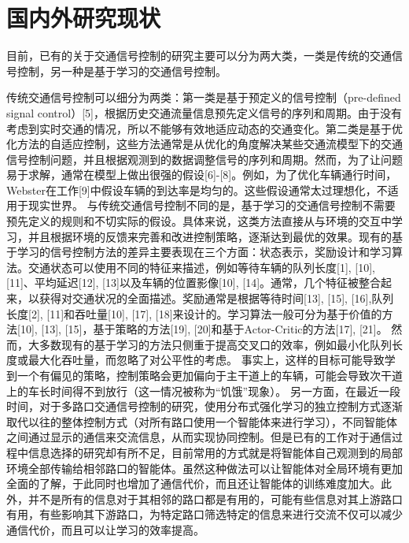 \section{国内外研究现状}
目前，已有的关于交通信号控制的研究主要可以分为两大类，一类是传统的交通信号控制，另一种是基于学习的交通信号控制。

传统交通信号控制可以细分为两类：第一类是基于预定义的信号控制（pre-defined signal control）[5]，根据历史交通流量信息预先定义信号的序列和周期。由于没有考虑到实时交通的情况，所以不能够有效地适应动态的交通变化。第二类是基于优化方法的自适应控制，这些方法通常是从优化的角度解决某些交通流模型下的交通信号控制问题，并且根据观测到的数据调整信号的序列和周期。然而，为了让问题易于求解，通常在模型上做出很强的假设[6]-[8]。例如，为了优化车辆通行时间，Webster在工作[9]中假设车辆的到达率是均匀的。这些假设通常太过理想化，不适用于现实世界。
与传统交通信号控制不同的是，基于学习的交通信号控制不需要预先定义的规则和不切实际的假设。具体来说，这类方法直接从与环境的交互中学习，并且根据环境的反馈来完善和改进控制策略，逐渐达到最优的效果。现有的基于学习的信号控制方法的差异主要表现在三个方面：状态表示，奖励设计和学习算法。交通状态可以使用不同的特征来描述，例如等待车辆的队列长度[1], [10], [11]、平均延迟[12], [13]以及车辆的位置影像[10], [14]。通常，几个特征被整合起来，以获得对交通状况的全面描述。奖励通常是根据等待时间[13], [15], [16],队列长度[2], [11]和吞吐量[10], [17], [18]来设计的。学习算法一般可分为基于价值的方法[10], [13], [15]，基于策略的方法[19], [20]和基于Actor-Critic的方法[17], [21]。
然而，大多数现有的基于学习的方法只侧重于提高交叉口的效率，例如最小化队列长度或最大化吞吐量，而忽略了对公平性的考虑。 事实上，这样的目标可能导致学到一个有偏见的策略，控制策略会更加偏向于主干道上的车辆，可能会导致次干道上的车长时间得不到放行（这一情况被称为“饥饿”现象）。 另一方面，在最近一段时间，对于多路口交通信号控制的研究，使用分布式强化学习的独立控制方式逐渐取代以往的整体控制方式（对所有路口使用一个智能体来进行学习），不同智能体之间通过显示的通信来交流信息，从而实现协同控制。但是已有的工作对于通信过程中信息选择的研究却有所不足，目前常用的方式就是将智能体自己观测到的局部环境全部传输给相邻路口的智能体。虽然这种做法可以让智能体对全局环境有更加全面的了解，于此同时也增加了通信代价，而且还让智能体的训练难度加大。此外，并不是所有的信息对于其相邻的路口都是有用的，可能有些信息对其上游路口有用，有些影响其下游路口，为特定路口筛选特定的信息来进行交流不仅可以减少通信代价，而且可以让学习的效率提高。

